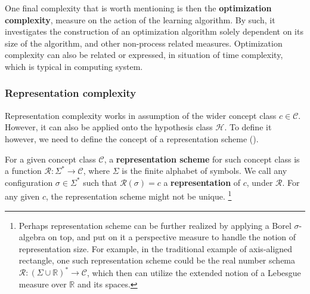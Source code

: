 One final complexity that is worth mentioning is then the \textbf{optimization complexity}, measure on the action of the learning algorithm. By such, it investigates the construction of an optimization algorithm solely dependent on its size of the algorithm, and other non-process related measures. Optimization complexity can also be related or expressed, in situation of time complexity, which is typical in computing system. 

\subsubsection{Representation complexity}

Representation complexity works in assumption of the wider concept class $c\in \mathcal{C}$. However, it can also be applied onto the hypothesis class $\mathcal{H}$. To define it however, we need to define the concept of a representation scheme (\cite{10.5555/200548}). 

\begin{definition}
    For a given concept class $\mathcal{C}$, a \textbf{representation scheme} for such concept class is a function $\mathcal{R}: \Sigma^{*}\to \mathcal{C}$, where $\Sigma$ is the finite alphabet of symbols. We call any configuration $\sigma \in \Sigma^{*}$ such that $\mathcal{R}(\sigma)=c$ a \textbf{representation} of $c$, under $\mathcal{R}$. For any given $c$, the representation scheme might not be unique. \footnote{Perhaps representation scheme can be further realized by applying a Borel $\sigma$-algebra on top, and put on it a perspective measure to handle the notion of representation size. For example, in the traditional example of axis-aligned rectangle, one such representation scheme could be the real number schema $\mathcal{R}:(\Sigma \cup \mathbb{R})^{*}\to \mathcal{C}$, which then can utilize the extended notion of a Lebesgue measure over $\mathbb{R}$ and its spaces.}
\end{definition} 

